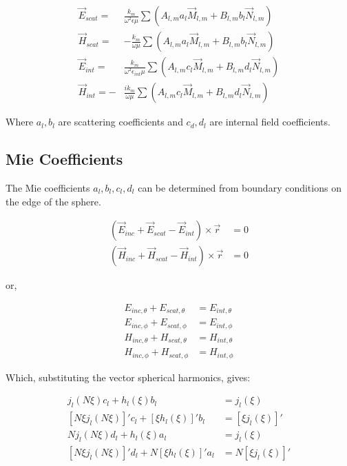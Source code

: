         \begin{align}
            \vec{E}_{scat}=& \frac{k_m}{\omega^2\epsilon\mu}\sum\left(A_{l,m}a_l\vec{M}_{l,m} + B_{l,m}b_l\vec{N}_{l,m}\right)\\
            \vec{H}_{scat}=&-\frac{k_m}{\omega\mu}\sum\left(A_{l,m}a_l\vec{M}_{l,m} + B_{l,m}b_l\vec{N}_{l,m}\right)\\
            \vec{E}_{int}=&\frac{k_m}{\omega^2\epsilon_{int}\mu}\sum\left(A_{l,m}c_l\vec{M}_{l,m} + B_{l,m}d_l\vec{N}_{l,m}\right)\\
            \vec{H}_{int}=-&\frac{ik_m}{\omega\mu}\sum\left(A_{l,m}c_l\vec{M}_{l,m} + B_{l,m}d_l\vec{N}_{l,m}\right)
        \end{align}

        Where $a_l, b_l$ are scattering coefficients and $c_d, d_l$ are internal field coefficients.

    \subsection{Mie Coefficients}

        The Mie coefficients $a_l, b_l, c_l, d_l$ can be determined from boundary conditions on the edge of the sphere.

        \begin{align}
            \left( \vec{E}_{inc} + \vec{E}_{scat} - \vec{E}_{int} \right) \times \vec{r} &= 0 \\
            \left( \vec{H}_{inc} + \vec{H}_{scat} - \vec{H}_{int} \right) \times \vec{r} &= 0
        \end{align}

        or,

        \begin{align}
            E_{inc,\theta} + E_{scat,\theta} &= E_{int, \theta} \\
            E_{inc,\phi} + E_{scat,\phi} &= E_{int, \phi} \\
            H_{inc,\theta} + H_{scat,\theta} &= H_{int, \theta} \\
            H_{inc,\phi} + H_{scat,\phi} &= H_{int, \phi}
        \end{align}

        Which, substituting the vector spherical harmonics, gives:

        \begin{align}
            j_l(N\xi)c_l + h_l(\xi)b_l&=j_l(\xi)\\
            [N\xi j_l(N\xi)]'c_l+ [\xi h_l(\xi)]'b_l&= [\xi j_l(\xi)]'\\
            Nj_l(N\xi)d_l + h_l(\xi)a_l &= j_l(\xi)\\
            [N\xi j_l(N\xi)]'d_l +N[\xi h_l(\xi)]'a_l &= N[\xi j_l(\xi)]'
        \end{align}

